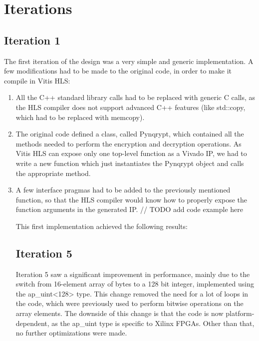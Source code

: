 \documentclass[12pt,oneside,a4paper]{article}
\begin{document}
\section{Iterations} \label{sec:iterations}

\subsection{Iteration 1} \label{subsec:iter1}
The first iteration of the design was a very simple and generic implementation. A few modifications had to be made to the original code, in order to make it compile in Vitis HLS:
\begin{enumerate}
	\item All the C++ standard library calls had to be replaced with generic C calls, as the HLS compiler does not support advanced C++ features (like std::copy, which had to be replaced with memcopy).
	\item The original code defined a class, called Pynqrypt, which contained all the methods needed to perform the encryption and decryption operations. As Vitis HLS can expose only one top-level function as a Vivado IP, we had to write a new function which just instantiates the Pynqrypt object and calls the appropriate method.
	\item A few interface pragmas had to be added to the previously mentioned function, so that the HLS compiler would know how to properly expose the function arguments in the generated IP.
// TODO add code example here

This first implementation achieved the following results:


\subsection{Iteration 5} \label{subsec:iter5}
Iteration 5 saw a significant improvement in performance, mainly due to the switch from 16-element array of bytes to a 128 bit integer, implemented using the ap\_uint<128> type.
This change removed the need for a lot of loops in the code, which were previously used to perform bitwise operations on the array elements.
The downside of this change is that the code is now platform-dependent, as the ap\_uint type is specific to Xilinx FPGAs. Other than that, no further optimizations were made.


\end{enumerate}
\end{document}
